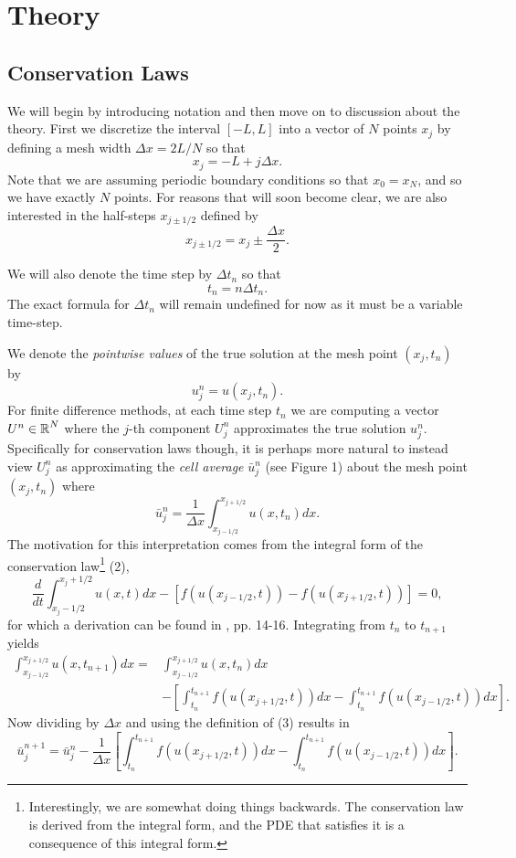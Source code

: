 \documentclass{myproject}
\begin{document}
\section{Theory}
\subsection{Conservation Laws}
We will begin by introducing notation and then move on to discussion about the theory. First we discretize the interval $[-L,L]$ into a vector of $N$ points $x_j$ by defining a mesh width $\Delta x = 2L/N$ so that 
\[
    x_j = -L + j\Delta x.
\]
Note that we are assuming periodic boundary conditions so that $x_0 = x_{N}$, and so we have exactly $N$ points. For reasons that will soon become clear, we are also interested in the half-steps $x_{j\pm1/2}$ defined by
\[
    x_{j\pm1/2} = x_j \pm \frac{\Delta x}{2}.
\]

We will also denote the time step by $\Delta t_n$ so that
\[
    t_n = n\Delta t_n.
\]
The exact formula for $\Delta t_n$ will remain undefined for now as it must be a variable time-step.

We denote the \emph{pointwise values} of the true solution at the mesh point $(x_j, t_n)$ by 
\[
    u_j^n = u(x_j,t_n).
\]
For finite difference methods, at each time step $t_n$ we are computing a vector $U^n \in \operatorname{\mathbb{R}}^N$ where the $j$-th component $U_j^n$ approximates the true solution $u_j^n$. Specifically for conservation laws though, it is perhaps more natural to instead view $U_j^n$ as approximating the \emph{cell average} $\bar{u}_j^n$ (see Figure 1) about the mesh point $(x_j,t_n)$ where
\begin{equation}
    \bar{u}_j^n = \frac{1}{\Delta x} \int_{x_{j-1/2}}^{x_{j+1/2}} u(x,t_n) dx.
\end{equation}
The motivation for this interpretation comes from the integral form of the conservation law\footnote{Interestingly, we are somewhat doing things backwards. The conservation law is derived from the integral form, and the PDE that satisfies it is a consequence of this integral form.} (2),
\[
    \frac{d}{dt} \int_{x_j-1/2}^{x_j+1/2} u(x,t)dx - \left[ f(u(x_{j-1/2},t)) - f(u(x_{j+1/2},t)) \right] = 0,
\]
for which a derivation can be found in \cite{leveque1992}, pp. 14-16. Integrating from $t_n$ to $t_{n+1}$ yields
\begin{align*}
    \int_{x_{j-1/2}}^{x_{j+1/2}} u(x,t_{n+1}) dx = &\int_{x_{j-1/2}}^{x_{j+1/2}} u(x,t_{n}) dx \\
    &- \left[ \int_{t_n}^{t_{n+1}} f(u(x_{j+1/2},t)) dx - \int_{t_n}^{t_{n+1}} f(u(x_{j-1/2},t)) dx \right].
\end{align*}
Now dividing by $\Delta x$ and using the definition of (3) results in
\begin{equation}
    \bar{u}_j^{n+1} = \bar{u}_j^n - \frac{1}{\Delta x}\left[ \int_{t_n}^{t_{n+1}} f(u(x_{j+1/2},t)) dx - \int_{t_n}^{t_{n+1}} f(u(x_{j-1/2},t)) dx \right].
\end{equation}
\end{document}
